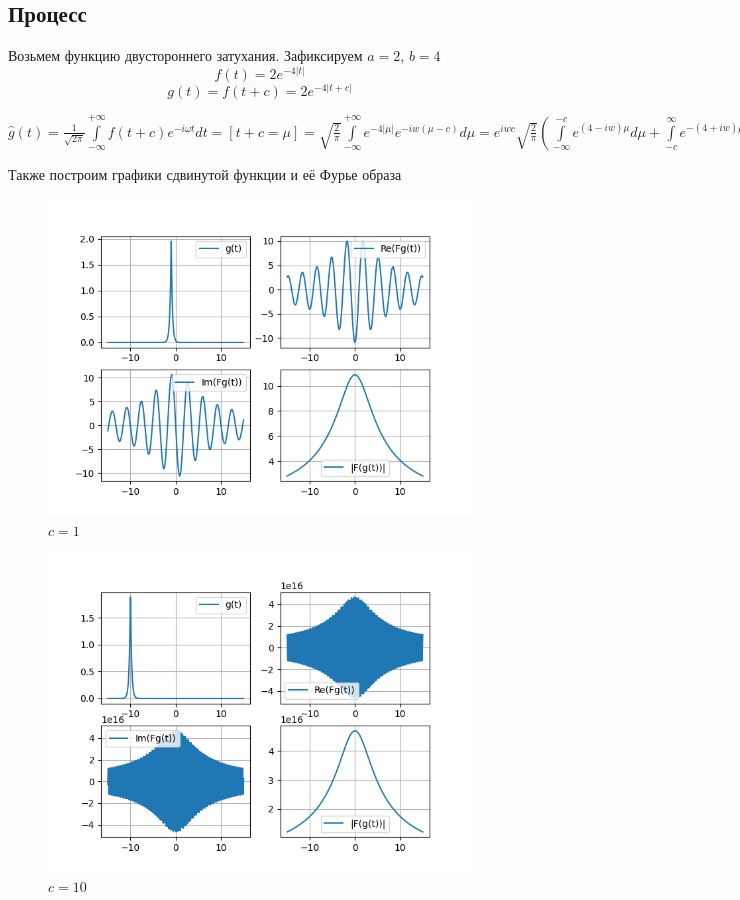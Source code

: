   \subsection{Процесс}
  \noindent Возьмем функцию двустороннего затухания. Зафиксируем $a = 2$, $b = 4$
   \[
  f(t) = 2e^{-4|t|}
  \]
  \[
  g(t) = f(t + c) = 2e^{-4|t+c|}  
  \]
  \begin{center}
    $\hat{g}(t) = \frac{1}{\sqrt{2\pi}} \int\limits_{-\infty}^{+\infty}f(t+c)e^{-i\omega t}dt = [t+c = \mu]=
  \sqrt{\frac{2}{\pi}}\int\limits_{-\infty}^{+\infty}e^{-4|\mu|} e^{-iw(\mu-c)}d\mu 
 =
  e^{iwc} \sqrt{\frac{2}{\pi}}(\int\limits_{-\infty}^{-c} e^{(4 - iw)\mu}d\mu + \int\limits_{-c}^{\infty} e^{-(4 + iw)\mu}d\mu)
  =
  e^{iwc} \sqrt{\frac{2}{\pi}}(\frac{1}{4-iw}e^{-c(4-iw)} + \frac{1}{-(4+iw)}e^{c(4+iw)})
  $ 
  \end{center} 
  Также построим графики сдвинутой функции и её Фурье образа
  \newpage
  \begin{figure}[!htb]
    \centering
      \includegraphics[scale=0.7]{../image/complex_case_img/com_1'.png}
      \caption{$c=1$}
  \end{figure}
  \begin{figure}
    \centering
      \includegraphics[scale=0.9]{../image/complex_case_img/com_10.png}
    \caption{$c=10$}
    \end{figure}
